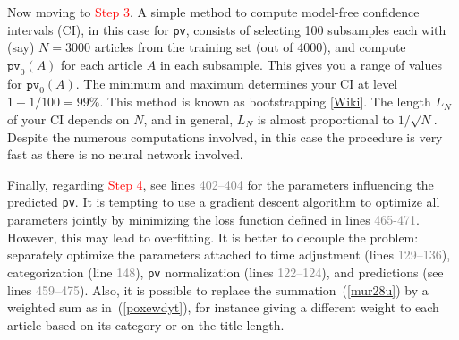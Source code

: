 \documentclass[oneside,10pt]{book}
\begin{document}
Now moving to \textcolor{red}{Step 3}. A simple method to compute model-free 
\textcolor{index}{confidence intervals} (CI), in this case for \texttt{pv}, consists of selecting 100 
subsamples each with (say) $N=3000$ articles from the training set (out of 4000), and compute $\texttt{pv}_0(A)$ for each article $A$ in each subsample.
 This gives you a range of values for $\texttt{pv}_0(A)$. The minimum and maximum determines your CI at level
 $1 - 1/100 = 99\%$. This method is known as \textcolor{index}{bootstrapping} [\href{https://en.wikipedia.org/wiki/Bootstrapping_(statistics)}{Wiki}]. 
The length $L_N$ of your CI depends on $N$, and in general, $L_N$ is almost proportional to $1/\sqrt{N}$. Despite the numerous computations involved, in this case
 the procedure is very fast as there is no neural network involved. 

Finally, regarding \textcolor{red}{Step 4}, see lines \textcolor{gray}{402--404} for the parameters influencing the predicted \texttt{pv}. 
It is tempting to use a \textcolor{index}{gradient descent} algorithm to optimize all parameters jointly by minimizing the \textcolor{index}{loss function} defined in lines \textcolor{gray}{465-471}. However, this may lead to overfitting. It is better to decouple the problem:
 separately optimize the parameters attached to time adjustment (lines \textcolor{gray}{129--136}), categorization (line \textcolor{gray}{148}), \texttt{pv} normalization (lines \textcolor{gray}{122--124}), and predictions 
(see lines \textcolor{gray}{459--475}). Also, it is possible to replace the summation~(\ref{mur28u}) by a weighted sum as in~(\ref{poxewdyt}), for instance giving
 a different weight to each article based on its category or on the title length. 
\end{document}
